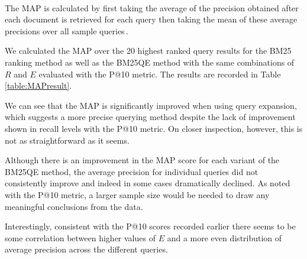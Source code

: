 \paragraph*{}
The MAP is calculated by first taking the average of the precision obtained after each document is retrieved for each query then taking the mean of these average precisions over all sample queries\,\cite[pp. 13-14]{scholer13eval}.

We calculated the MAP over the 20 highest ranked query results for the BM25 ranking method as well as the BM25QE method with the same combinations of $R$ and $E$ evaluated with the P@10 metric. The results are recorded in Table \ref{table:MAPresult}.

\begin{centering}
\begin{table}
\caption {Average Precision and Mean Average Precision \% for each query method}\label{table:MAPresult}
\end{table}
\end{centering}

We can see that the MAP is significantly improved when using query expansion, which suggests a more precise querying method despite the lack of improvement shown in recall levels with the P@10 metric. On closer inspection, however, this is not as straightforward as it seems.

Although there is an improvement in the MAP score for each variant of the BM25QE method, the average precision for individual queries did not consistently improve and indeed in some cases dramatically declined. As noted with the P@10 metric, a larger sample size would be needed to draw any meaningful conclusions from the data.

Interestingly, consistent with the P@10 scores recorded earlier there seems to be some correlation between higher values of $E$ and a more even distribution of average precision across the different queries.
